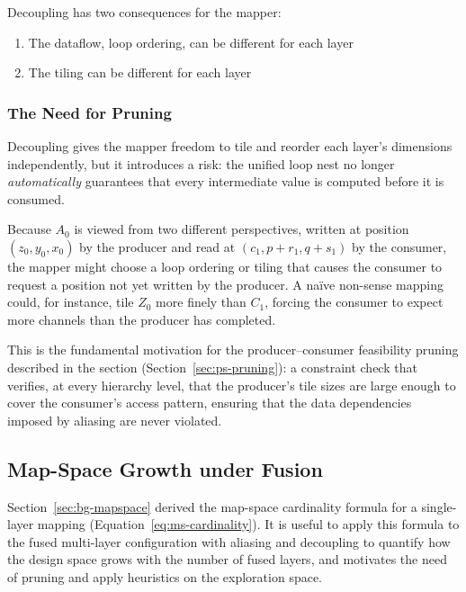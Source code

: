 \medskip
\noindent
Decoupling has two consequences for the mapper:
\begin{enumerate}
  \item The dataflow, loop ordering, can be different for each layer
  \item The tiling can be different for each layer
\end{enumerate}


\subsubsection{The Need for Pruning}

Decoupling gives the mapper freedom to tile and reorder each layer's
dimensions independently, but it introduces a risk: the unified loop
nest no longer \emph{automatically} guarantees that every intermediate
value is computed before it is consumed.

Because $A_0$ is viewed from two different perspectives, written at
position $(z_0, y_0, x_0)$ by the producer and read at
$(c_1, p\!+\!r_1, q\!+\!s_1)$ by the consumer, the mapper might
choose a loop ordering or tiling that causes the consumer to request a
position not yet written by the producer.
A na\"ive non-sense mapping could, for instance, tile $Z_0$ more finely than
$C_1$, forcing the consumer to expect more channels than the producer
has completed.

This is the fundamental motivation for the producer--consumer
feasibility pruning described in the section
(Section~\ref{sec:ps-pruning}): a constraint check that verifies, at
every hierarchy level, that the producer's tile sizes are large enough
to cover the consumer's access pattern, ensuring that the data
dependencies imposed by aliasing are never violated.

\noindent








\subsection{Map-Space Growth under Fusion}
\label{sec:ps-mapspace}

Section~\ref{sec:bg-mapspace} derived the map-space cardinality
formula for a single-layer mapping
(Equation~\ref{eq:ms-cardinality}).
It is useful to apply this formula to the fused multi-layer configuration
with aliasing and decoupling to quantify how the design space grows with the number of fused
layers, and motivates the need of pruning and apply heuristics on the exploration space.




